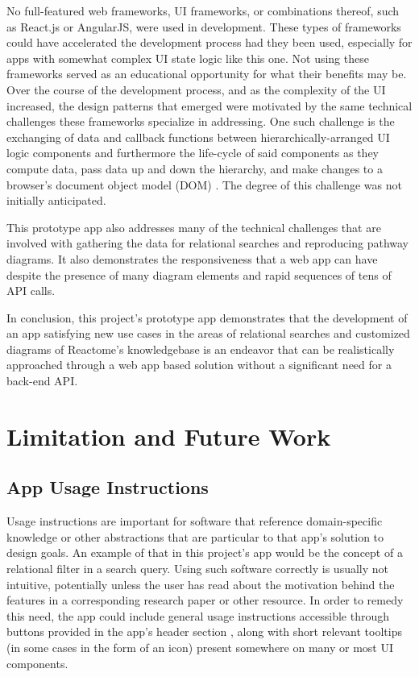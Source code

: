 \documentclass[12pt]{report}
\begin{document}
No full-featured web frameworks, UI frameworks, or combinations thereof, such as React.js or AngularJS, were used in development. These types of frameworks could have accelerated the development process had they been used, especially for apps with somewhat complex UI state logic like this one. Not using these frameworks served as an educational opportunity for what their benefits may be. Over the course of the development process, and as the complexity of the UI increased, the design patterns that emerged were motivated by the same technical challenges these frameworks specialize in addressing. One such challenge is the exchanging of data and callback functions between hierarchically-arranged UI logic components and furthermore the life-cycle of said components as they compute data, pass data up and down the hierarchy, and make changes to a browser's document object model (DOM) \cite{ReactJSMainConcepts}. The degree of this challenge was not initially anticipated.

This prototype app also addresses many of the technical challenges that are involved with gathering the data for relational searches and reproducing pathway diagrams. It also  demonstrates the responsiveness that a web app can have despite the presence of many diagram elements and rapid sequences of tens of API calls.

In conclusion, this project's prototype app demonstrates that the development of an app satisfying new use cases in the areas of relational searches and customized diagrams of Reactome's knowledgebase is an endeavor that can be realistically approached through a web app based solution without a significant need for a back-end API.

\chapter{Limitation and Future Work}

\section {App Usage Instructions}
Usage instructions are important for software that reference domain-specific knowledge or other abstractions that are particular to that app's solution to design goals. An example of that in this project's app would be the concept of a relational filter in a search query. Using such software correctly is usually not intuitive, potentially unless the user has read about the motivation behind the features in a corresponding research paper or other resource. In order to remedy this need, the app could include general usage instructions accessible through buttons provided in the app's header section , along with short relevant tooltips (in some cases in the form of an icon) present somewhere on many or most UI components.
\end{document}
